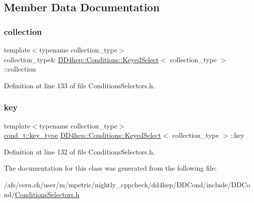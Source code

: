 \subsection{Member Data Documentation}
\hypertarget{class_d_d4hep_1_1_conditions_1_1_keyed_select_ace147c1925f1b99fd5582e1a251e6bbd}{}\label{class_d_d4hep_1_1_conditions_1_1_keyed_select_ace147c1925f1b99fd5582e1a251e6bbd} 
\subsubsection{\texorpdfstring{collection}{collection}}
{\footnotesize\ttfamily template$<$typename collection\+\_\+type$>$ \\
collection\+\_\+type\& \hyperlink{class_d_d4hep_1_1_conditions_1_1_keyed_select}{D\+D4hep\+::\+Conditions\+::\+Keyed\+Select}$<$ collection\+\_\+type $>$\+::collection\hspace{0.3cm}{\ttfamily [private]}}



Definition at line 133 of file Conditions\+Selectors.\+h.

\hypertarget{class_d_d4hep_1_1_conditions_1_1_keyed_select_aaa2b0dfe26393c92a82ff5c203c5398e}{}\label{class_d_d4hep_1_1_conditions_1_1_keyed_select_aaa2b0dfe26393c92a82ff5c203c5398e} 
\subsubsection{\texorpdfstring{key}{key}}
{\footnotesize\ttfamily template$<$typename collection\+\_\+type$>$ \\
\hyperlink{class_d_d4hep_1_1_conditions_1_1_condition_a7528efa762e8cc072ef80ea67c3531f9}{cond\+\_\+t\+::key\+\_\+type} \hyperlink{class_d_d4hep_1_1_conditions_1_1_keyed_select}{D\+D4hep\+::\+Conditions\+::\+Keyed\+Select}$<$ collection\+\_\+type $>$\+::key\hspace{0.3cm}{\ttfamily [private]}}



Definition at line 132 of file Conditions\+Selectors.\+h.



The documentation for this class was generated from the following file\+:\begin{DoxyCompactItemize}
\item 
/afs/cern.\+ch/user/m/mpetric/nightly\+\_\+cppcheck/dd4hep/\+D\+D\+Cond/include/\+D\+D\+Cond/\hyperlink{_conditions_selectors_8h}{Conditions\+Selectors.\+h}\end{DoxyCompactItemize}
